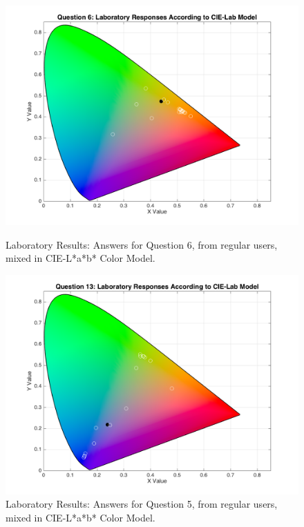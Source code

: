 \begin{figure}[htbp]
  \centering
  \begin{minipage}{0.48\textwidth}
    \centering
    \includegraphics[width=\textwidth]{images/6_lab_Labresponses.png}
    \caption[Laboratory Results: Answers for Question 6, from regular users, mixed in CIE-L*a*b* Color Model.]{Laboratory Results: Answers for Question 6, from regular users, mixed in CIE-L*a*b* Color Model.}
    \label{fig:lablabregular_6}
  \end{minipage}\hfill
  \begin{minipage}{0.48\textwidth}
    \centering
    \includegraphics[width=\textwidth]{images/13_lab_Labresponses.png}
    \caption[Laboratory Results: Answers for Question 13, from regular users, mixed in CIE-L*a*b* Color Model.]{Laboratory Results: Answers for Question 5, from regular users, mixed in CIE-L*a*b* Color Model.}
    \label{fig:lablabregular_13}
  \end{minipage}
\end{figure}
